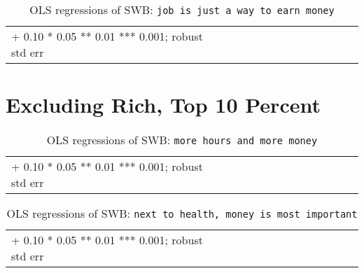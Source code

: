 \documentclass[10pt, letterpaper]{article}
\begin{document}
\begin{spacing}{1.8}
\begin{spacing}{.9} \begin{table}[H]\centering  \label{d} \begin{scriptsize} \begin{tabular}{p{1.8in}p{.5in}p{.5in}p{.5in}p{.5in}p{.5in}p{.5in}p{.5in}p{.5in}p{.5in}p{.5 in}p{.5in}p{.5 in}}\hline  \hline + 0.10 * 0.05 ** 0.01 *** 0.001; robust std err \end{tabular}\end{scriptsize}\caption{OLS regressions of SWB:  \texttt{job is just a way to earn money}}\end{table} \end{spacing}


\section{Excluding Rich, Top 10 Percent}

\begin{spacing}{.9} \begin{table}[H]\centering  \label{a} \begin{scriptsize} \begin{tabular}{p{1.8in}p{.5in}p{.5in}p{.5in}p{.5in}p{.5in}p{.5in}p{.5in}p{.5in}p{.5in}p{.5 in}p{.5in}p{.5 in}}\hline  \hline + 0.10 * 0.05 ** 0.01 *** 0.001; robust std err \end{tabular}\end{scriptsize}\caption{OLS regressions of SWB: \texttt{more hours and more money}}\end{table} \end{spacing}

\begin{spacing}{.9} \begin{table}[H]\centering  \label{b} \begin{scriptsize} \begin{tabular}{p{1.8in}p{.5in}p{.5in}p{.5in}p{.5in}p{.5in}p{.5in}p{.5in}p{.5in}p{.5in}p{.5 in}p{.5in}p{.5 in}}\hline  \hline + 0.10 * 0.05 ** 0.01 *** 0.001; robust std err \end{tabular}\end{scriptsize}\caption{OLS regressions of SWB:  \texttt{next to  health, money is most  important}}\end{table} \end{spacing}


\end{spacing}
\end{document}
